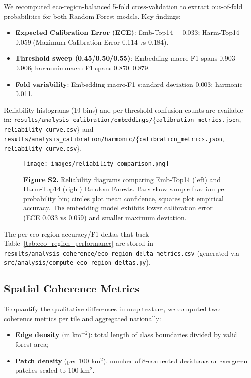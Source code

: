 \documentclass[utf8]{frontiers_suppmat}
\begin{document}
We recomputed eco-region-balanced 5-fold cross-validation to extract out-of-fold probabilities for both Random Forest models. Key findings:

\begin{itemize}
    \item \textbf{Expected Calibration Error (ECE)}: Emb-Top14 = 0.033; Harm-Top14 = 0.059 (Maximum Calibration Error 0.114 vs 0.184).
    \item \textbf{Threshold sweep (0.45/0.50/0.55)}: Embedding macro-F1 spans 0.903–0.906; harmonic macro-F1 spans 0.870–0.879.
    \item \textbf{Fold variability}: Embedding macro-F1 standard deviation 0.003; harmonic 0.011.
\end{itemize}

Reliability histograms (10 bins) and per-threshold confusion counts are available in: \texttt{results/analysis\_calibration/embeddings/}\{\texttt{calibration\_metrics.json}, \texttt{reliability\_curve.csv}\} and \texttt{results/analysis\_calibration/harmonic/}\{\texttt{calibration\_metrics.json}, \texttt{reliability\_curve.csv}\}.

\begin{figure}[H]
    \centering
    \texttt{[image: images/reliability\_comparison.png]}
    \caption{\textbf{Figure S2.} Reliability diagrams comparing Emb-Top14 (left) and Harm-Top14 (right) Random Forests. Bars show sample fraction per probability bin; circles plot mean confidence, squares plot empirical accuracy. The embedding model exhibits lower calibration error (ECE 0.033 vs 0.059) and smaller maximum deviation.}
    \label{fig:reliability}
\end{figure}

The per-eco-region accuracy/F1 deltas that back Table~\ref{tab:eco_region_performance} are stored in \texttt{results/analysis\_coherence/eco\_region\_delta\_metrics.csv} (generated via \texttt{src/analysis/compute\_eco\_region\_deltas.py}).

\subsection{Spatial Coherence Metrics}

To quantify the qualitative differences in map texture, we computed two coherence metrics per tile and aggregated nationally:
\begin{itemize}
    \item \textbf{Edge density} (m km$^{-2}$): total length of class boundaries divided by valid forest area;
    \item \textbf{Patch density} (per 100 km$^{2}$): number of 8-connected deciduous or evergreen patches scaled to 100 km$^{2}$.
\end{itemize}
\end{document}
